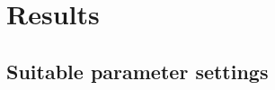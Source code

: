

\chapter{Results} %



\ifpdf
    \graphicspath{{6/figures/PNG/}{6/figures/PDF/}{6/figures/}}
\else
    \graphicspath{{6/figures/EPS/}{6/figures/}}
\fi




\section{Suitable parameter settings}





